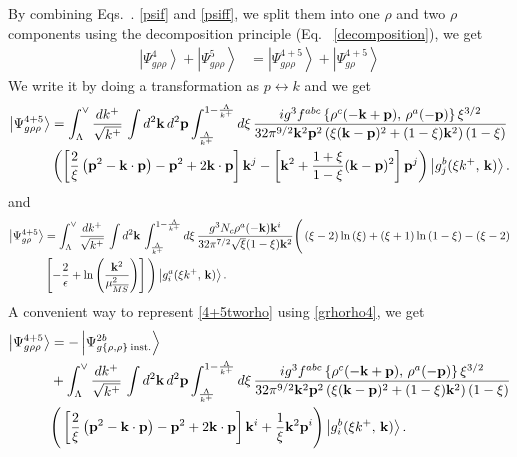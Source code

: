 \documentclass[aps,prd,amsmath,amssymb,nofootinbib]{revtex4-2}
\numberwithin{equation}{section}
\begin{document}
By combining Eqs.~. \eqref{psif} and \eqref{psiff}, we split them into one $\rho$ and two $\rho$ components using the decomposition principle (Eq.~ \eqref{decomposition}), we get 
\begin{align}
    \left|\Psi_{g\rho\rho}^{4}\right\rangle + \left|\Psi_{g\rho\rho}^{5}\right\rangle & =  \left|\Psi_{g\rho\rho}^{4+5}\right\rangle + \left|\Psi_{g\rho}^{4+5}\right\rangle
\end{align}
We write it by doing a transformation as $p\leftrightarrow k$ and we get 
\begin{align}\label{4+5tworho}
\left|\Psi_{g\rho\rho}^{4+5}\right\rangle & =
\int_{\Lambda}^{\vee}\frac{dk^{+}}{\sqrt{k^{+}}}\,\int d^{2}\mathbf{k}\, d^{2}\mathbf{p}\int_{\frac{\Lambda}{k^{+}}}^{1-\frac{\Lambda}{k^{+}}}d\xi\,\frac{ig^{3}f^{abc}\left\{ \rho^{c}(-\mathbf{k}+\mathbf{p}),\,\rho^{a}(-\mathbf{p})\right\} \xi^{3/2}}{32\pi^{9/2}\mathbf{k}^{2}\mathbf{p}^{2}\left(\xi(\mathbf{k}-\mathbf{p})^{2}+(1-\xi)\mathbf{k}^{2}\right)(1-\xi)}\notag \\ & \left(\left[\frac{2}{\xi}\left(\mathbf{p}^{2}-\mathbf{k}\cdot \mathbf{p}\right)-\mathbf{p}^{2}+2\mathbf{k}\cdot \mathbf{p}\right]\mathbf{k}^{j}-\left[\mathbf{k}^{2}+\frac{1+\xi}{1-\xi}(\mathbf{k}-\mathbf{p})^{2}\right]\mathbf{p}^{j}\right)\left|g_{j}^{b}(\xi k^{+},\, \mathbf{k})\right\rangle.
\end{align}
and
\begin{align}\label{4+5onerho}
   \left|\Psi_{g\rho}^{4+5}\right\rangle & =  \int_{\Lambda}^{\vee}\frac{dk^{+}}{\sqrt{k^{+}}}\,\int d^{2}\mathbf{k}\,\int_{\frac{\Lambda}{k^{+}}}^{1-\frac{\Lambda}{k^{+}}}d\xi\,\frac{g^{3}N_{c}\rho^{a}(-\mathbf{k})\mathbf{k}^{i}}{32\pi^{7/2}\sqrt{\xi}(1-\xi)\mathbf{k}^{2}}\Bigg(\left(\xi-2\right)\ln\left(\xi\right)+\left(\xi+1\right)\ln\left(1-\xi\right)-\left(\xi-2\right)\notag \\ & \left[-\frac{2}{\epsilon}+\ln\left(\frac{\mathbf{k}^{2}}{\mu_{\overline{MS}}^{2}}\right)\right]\Bigg)\left|g_{i}^{a}(\xi k^{+},\, \mathbf{k})\right\rangle.
\end{align}
A convenient way to represent \eqref{4+5tworho} using \eqref{grhorho4}, we get
\begin{align}\label{4+5tworhosimpl}
\left|\Psi_{g\rho\rho}^{4+5}\right\rangle & =-\left|\Psi_{g\{\rho,\rho\}\:\text{inst.}}^{2b}\right\rangle \notag \\ & 
+\int_{\Lambda}^{\vee}\frac{dk^{+}}{\sqrt{k^{+}}}\,\int d^{2}\mathbf{k}\, d^{2}\mathbf{p}\int_{\frac{\Lambda}{k^{+}}}^{1-\frac{\Lambda}{k^{+}}}d\xi\,\frac{ig^{3}f^{abc}\left\{ \rho^{c}(-\mathbf{k}+\mathbf{p}),\,\rho^{a}(-\mathbf{p})\right\} \xi^{3/2}}{32\pi^{9/2}\mathbf{k}^{2}\mathbf{p}^{2}\left(\xi(\mathbf{k}-\mathbf{p})^{2}+(1-\xi)\mathbf{k}^{2}\right)(1-\xi)}\notag \\ & \Bigg(\left[\frac{2}{\xi}\left(\mathbf{p}^{2}-\mathbf{k}\cdot \mathbf{p}\right)-\mathbf{p}^{2}+2\mathbf{k}\cdot \mathbf{p}\right]\mathbf{k}^{i}+\frac{1}{\xi}\mathbf{k}^{2}\mathbf{p}^{i}\Bigg)\left|g_{i}^{b}(\xi k^{+},\, \mathbf{k})\right\rangle.
\end{align}
\end{document}
